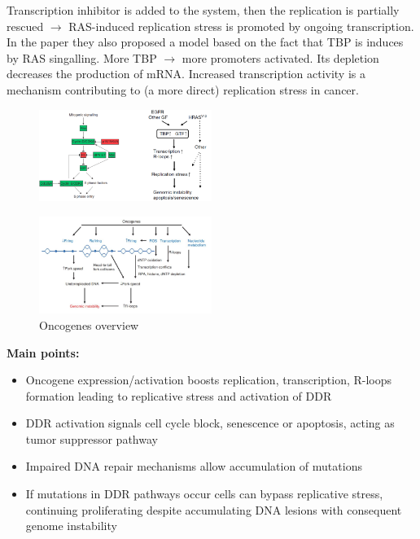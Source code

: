 Transcription inhibitor is added to the system, then the replication is
partially rescued $\rightarrow$ RAS-induced replication stress is
promoted by ongoing transcription. In the paper they also proposed a
model based on the fact that TBP is induces by RAS singalling. More TBP
$\rightarrow$ more promoters activated. Its depletion decreases the
production of mRNA. Increased transcription activity is a mechanism
contributing to (a more direct) replication stress in cancer.

\begin{figure}[H]
\centering
\includegraphics[width=0.5\textwidth]{../_resources/44bcc98a5cf90e0a6c62c0c54ac18ec8.png}
\label{fig:senescence}
\end{figure}

\begin{figure}[H]
\centering
\includegraphics[width=0.5\textwidth]{../_resources/a522e1eccf4aff0b733df053f8ae4a38.png}
\caption{Oncogenes overview}
\end{figure}

\textbf{Main points:} 
\begin{itemize}
\tightlist
\item Oncogene expression/activation boosts
replication, transcription, R-loops formation leading to replicative
stress and activation of DDR 
\item DDR activation signals cell cycle block,
senescence or apoptosis, acting as tumor suppressor pathway
\item Impaired
DNA repair mechanisms allow accumulation of mutations
\item If mutations in
DDR pathways occur cells can bypass replicative stress, continuing
proliferating despite accumulating DNA lesions with consequent genome
instability
\end{itemize}



